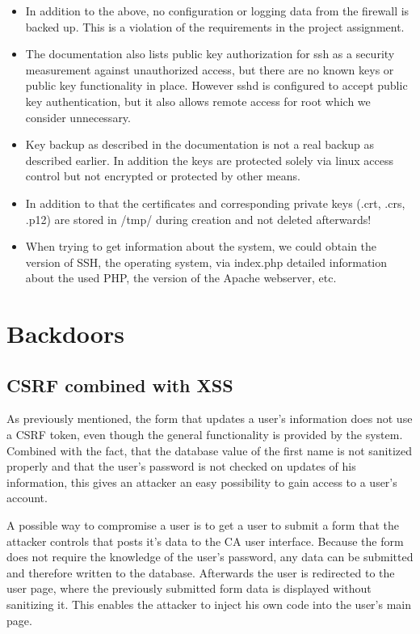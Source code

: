 \documentclass{article}
\begin{document}
\begin{itemize}
\item In addition to the above, no configuration or logging data from the firewall is backed up. This is a violation of the requirements in the project assignment.

\item The documentation also lists public key authorization for ssh as a security measurement against unauthorized access, but there are no known keys or public key functionality in place. However sshd is configured to accept public key authentication, but it also allows remote access for root which we consider unnecessary.

\item Key backup as described in the documentation is not a real backup as described earlier. In addition the keys are protected solely via linux access control but not encrypted or protected by other means.

\item In addition to that the certificates and corresponding private keys (.crt, .crs, .p12) are stored in /tmp/ during creation and not deleted afterwards! 

\item When trying to get information about the system, we could obtain the version of SSH, the operating system, via index.php detailed information about the used PHP, the version of the Apache webserver, etc.
\end{itemize}

\section{Backdoors}
\subsection{CSRF combined with XSS}
As previously mentioned, the form that updates a user's information does not use a CSRF token, even though the general functionality is provided by the system. Combined with the fact, that the database value of the first name is not sanitized properly and that the user's password is not checked on updates of his information, this gives an attacker an easy possibility to gain access to a user's account.

A possible way to compromise a user is to get a user to submit a form that the attacker controls that posts it's data to the CA user interface. Because the form does not require the knowledge of the user's password, any data can be submitted and therefore written to the database. Afterwards the user is redirected to the user page, where the previously submitted form data is displayed without sanitizing it. This enables the attacker to inject his own code into the user's main page.
\end{document}
